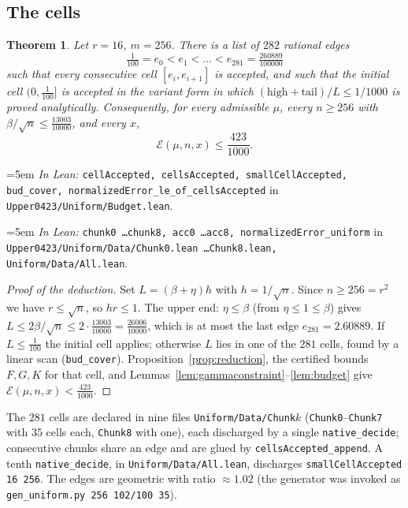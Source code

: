 \documentclass[11pt,a4paper]{article}
\newtheorem{theorem}{Theorem}[section]
\theoremstyle{definition}
\newcommand{\Lean}[1]{\texttt{#1}}
\newcommand{\file}[1]{\texttt{#1}}
\newcommand{\formal}[2]{%
  \par\smallskip
  \begingroup\small\raggedright\emergencystretch=5em
  \noindent\textit{In Lean:} \Lean{#1} in \file{#2}.\par
  \endgroup\smallskip}
\begin{document}
\subsection{The cells}

\begin{theorem}
  \label{thm:uniform}
  Let $r=16$, $m=256$. There is a list of $282$ rational edges
  \[
    \tfrac1{100}=e_0<e_1<\dots<e_{281}=\tfrac{260889}{100000}
  \]
  such that every consecutive cell $[e_i,e_{i+1}]$ is accepted, and such that the
  initial cell $(0,\tfrac1{100}]$ is accepted in the variant form in which
  $(\mathrm{high}+\mathrm{tail})/L\le1/1000$ is proved analytically. Consequently,
  for every admissible $\mu$, every $n\ge256$ with
  $\beta/\sqrt n\le\tfrac{13003}{10000}$, and every $x$,
  \[
    \mathcal E(\mu,n,x)\le\frac{423}{1000} .
  \]
\end{theorem}
\formal{cellAccepted, cellsAccepted, smallCellAccepted, bud\_cover, normalizedError\_le\_of\_cellsAccepted}{Upper0423/Uniform/Budget.lean}
\formal{chunk0 \dots chunk8, acc0 \dots acc8, normalizedError\_uniform}{Upper0423/Uniform/Data/Chunk0.lean \dots Chunk8.lean, Uniform/Data/All.lean}

\begin{proof}[Proof of the deduction]
  Set $L=(\beta+\eta)h$ with $h=1/\sqrt n$. Since $n\ge256=r^2$ we have
  $r\le\sqrt n$, so $hr\le1$. The upper end: $\eta\le\beta$ (from $\eta\le1\le\beta$)
  gives $L\le2\beta/\sqrt n\le2\cdot\tfrac{13003}{10000}=\tfrac{26006}{10000}$,
  which is at most the last edge $e_{281}=2.60889$. If $L\le\tfrac1{100}$ the
  initial cell applies; otherwise $L$ lies in one of the $281$ cells, found by a
  linear scan (\Lean{bud\_cover}). Proposition~\ref{prop:reduction},
  the certified bounds $F,G,K$ for that cell, and
  Lemmas~\ref{lem:gammaconstraint}--\ref{lem:budget} give
  $\mathcal E(\mu,n,x)<\tfrac{423}{1000}$.
\end{proof}

The $281$ cells are declared in nine files \file{Uniform/Data/Chunk}$k$
(\Lean{Chunk0}--\Lean{Chunk7} with $35$ cells each, \Lean{Chunk8} with one),
each discharged by a single \Lean{native\_decide}; consecutive chunks share an
edge and are glued by \Lean{cellsAccepted\_append}. A tenth
\Lean{native\_decide}, in \file{Uniform/Data/All.lean}, discharges
\Lean{smallCellAccepted 16 256}. The edges are geometric with ratio
$\approx1.02$ (the generator was invoked as
\verb|gen_uniform.py 256 102/100 35|).
\end{document}
